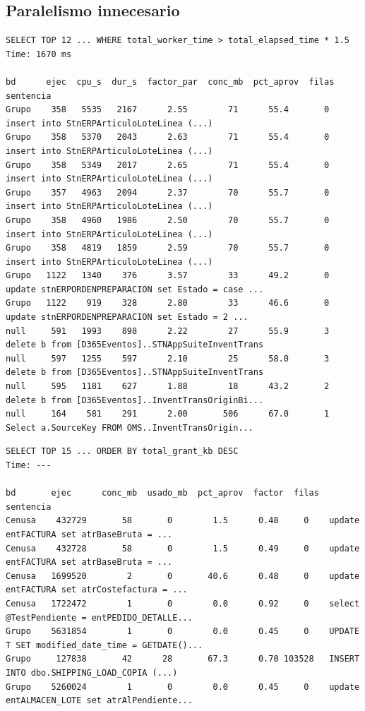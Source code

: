 \documentclass[11pt,a4paper]{article}
\begin{document}
\subsection{Paralelismo innecesario}

\begin{lstlisting}[style=salida]
SELECT TOP 12 ... WHERE total_worker_time > total_elapsed_time * 1.5
Time: 1670 ms

bd      ejec  cpu_s  dur_s  factor_par  conc_mb  pct_aprov  filas  sentencia
Grupo    358   5535   2167      2.55        71      55.4       0   insert into StnERPArticuloLoteLinea (...)
Grupo    358   5370   2043      2.63        71      55.4       0   insert into StnERPArticuloLoteLinea (...)
Grupo    358   5349   2017      2.65        71      55.4       0   insert into StnERPArticuloLoteLinea (...)
Grupo    357   4963   2094      2.37        70      55.7       0   insert into StnERPArticuloLoteLinea (...)
Grupo    358   4960   1986      2.50        70      55.7       0   insert into StnERPArticuloLoteLinea (...)
Grupo    358   4819   1859      2.59        70      55.7       0   insert into StnERPArticuloLoteLinea (...)
Grupo   1122   1340    376      3.57        33      49.2       0   update stnERPORDENPREPARACION set Estado = case ...
Grupo   1122    919    328      2.80        33      46.6       0   update stnERPORDENPREPARACION set Estado = 2 ...
null     591   1993    898      2.22        27      55.9       3   delete b from [D365Eventos]..STNAppSuiteInventTrans
null     597   1255    597      2.10        25      58.0       3   delete b from [D365Eventos]..STNAppSuiteInventTrans
null     595   1181    627      1.88        18      43.2       2   delete b from [D365Eventos]..InventTransOriginBi...
null     164    581    291      2.00       506      67.0       1   Select a.SourceKey FROM OMS..InventTransOrigin...
\end{lstlisting}

\begin{lstlisting}[style=salida]
SELECT TOP 15 ... ORDER BY total_grant_kb DESC
Time: ---

bd       ejec      conc_mb  usado_mb  pct_aprov  factor  filas  sentencia
Cenusa    432729       58       0        1.5      0.48     0    update entFACTURA set atrBaseBruta = ...
Cenusa    432728       58       0        1.5      0.49     0    update entFACTURA set atrBaseBruta = ...
Cenusa   1699520        2       0       40.6      0.48     0    update entFACTURA set atrCostefactura = ...
Cenusa   1722472        1       0        0.0      0.92     0    select @TestPendiente = entPEDIDO_DETALLE...
Grupo    5631854        1       0        0.0      0.45     0    UPDATE T SET modified_date_time = GETDATE()...
Grupo     127838       42      28       67.3      0.70 103528   INSERT INTO dbo.SHIPPING_LOAD_COPIA (...)
Grupo    5260024        1       0        0.0      0.45     0    update entALMACEN_LOTE set atrAlPendiente...
\end{lstlisting}
\end{document}
